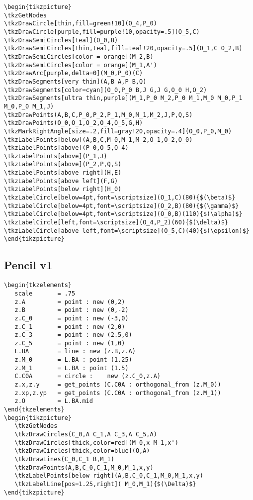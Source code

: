 \begin{Verbatim}
\begin{tikzpicture}
\tkzGetNodes
\tkzDrawCircle[thin,fill=green!10](O_4,P_0)
\tkzDrawCircle[purple,fill=purple!10,opacity=.5](O_5,C)
\tkzDrawSemiCircles[teal](O_0,B)
\tkzDrawSemiCircles[thin,teal,fill=teal!20,opacity=.5](O_1,C O_2,B)
\tkzDrawSemiCircles[color = orange](M_2,B)
\tkzDrawSemiCircles[color = orange](M_1,A')
\tkzDrawArc[purple,delta=0](M_0,P_0)(C)
\tkzDrawSegments[very thin](A,B A,P B,Q)
\tkzDrawSegments[color=cyan](O_0,P_0 B,J G,J G,O_0 H,O_2)
\tkzDrawSegments[ultra thin,purple](M_1,P_0 M_2,P_0 M_1,M_0 M_0,P_1 M_0,P_0 M_1,J)
\tkzDrawPoints(A,B,C,P_0,P_2,P_1,M_0,M_1,M_2,J,P,Q,S)
\tkzDrawPoints(O_0,O_1,O_2,O_4,O_5,G,H)
\tkzMarkRightAngle[size=.2,fill=gray!20,opacity=.4](O_0,P_0,M_0)
\tkzLabelPoints[below](A,B,C,M_0,M_1,M_2,O_1,O_2,O_0)
\tkzLabelPoints[above](P_0,O_5,O_4)
\tkzLabelPoints[above](P_1,J)
\tkzLabelPoints[above](P_2,P,Q,S)
\tkzLabelPoints[above right](H,E)
\tkzLabelPoints[above left](F,G)
\tkzLabelPoints[below right](H_0)
\tkzLabelCircle[below=4pt,font=\scriptsize](O_1,C)(80){$(\beta)$}
\tkzLabelCircle[below=4pt,font=\scriptsize](O_2,B)(80){$(\gamma)$}
\tkzLabelCircle[below=4pt,font=\scriptsize](O_0,B)(110){$(\alpha)$}
\tkzLabelCircle[left,font=\scriptsize](O_4,P_2)(60){$(\delta)$}
\tkzLabelCircle[above left,font=\scriptsize](O_5,C)(40){$(\epsilon)$}
\end{tikzpicture}
\end{Verbatim}



\subsection{Pencil v1} %
\label{sub:pencil_v1}
\begin{Verbatim}
\begin{tkzelements}
   scale       = .75
   z.A         = point : new (0,2)
   z.B         = point : new (0,-2)
   z.C_0       = point : new (-3,0)
   z.C_1       = point : new (2,0)
   z.C_3       = point : new (2.5,0)
   z.C_5       = point : new (1,0)
   L.BA        = line : new (z.B,z.A)
   z.M_0       = L.BA : point (1.25)
   z.M_1       = L.BA : point (1.5)
   C.C0A       = circle :    new (z.C_0,z.A)
   z.x,z.y     = get_points (C.C0A : orthogonal_from (z.M_0))
   z.xp,z.yp   = get_points (C.C0A : orthogonal_from (z.M_1))
   z.O         = L.BA.mid
\end{tkzelements}
\begin{tikzpicture}
   \tkzGetNodes
   \tkzDrawCircles(C_0,A C_1,A C_3,A C_5,A)
   \tkzDrawCircles[thick,color=red](M_0,x M_1,x')
   \tkzDrawCircles[thick,color=blue](O,A)
   \tkzDrawLines(C_0,C_1 B,M_1)
   \tkzDrawPoints(A,B,C_0,C_1,M_0,M_1,x,y)
   \tkzLabelPoints[below right](A,B,C_0,C_1,M_0,M_1,x,y)
   \tkzLabelLine[pos=1.25,right]( M_0,M_1){$(\Delta)$}
\end{tikzpicture}
\end{Verbatim}

